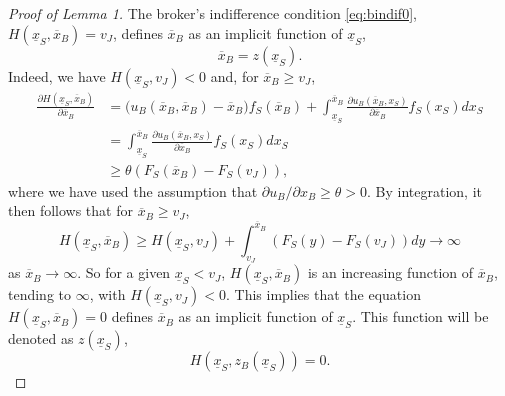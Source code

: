 \documentclass[11pt,twopage]{article}
\newcommand{\ol}{\overline}
\newcommand{\ul}{\underline}
\begin{document}
\begin{proof}[Proof of Lemma 1]
  The broker's indifference condition \eqref{eq:bindif0},
  $H(\underline x_S,\ol x_B) = v_J$, defines $\ol x_B$ as an implicit
  function of $\underline x_S$, \[ \ol x_B=z(\underline x_S).\]
  Indeed, we have $H(\ul x_S,v_J)<0$ and, for $\ol x_B \geq
  v_J$, \begin{align*} \frac{\partial H(\underline x_S,\ol
      x_B)}{\partial \ol x_B} &= \Big( u_B(\ol x_B,\ol x_B) - \ol x_B
    \Big)f_S(\ol x_B)+\int_{\ul x_S}^{\ol x_B} \frac{\partial u_B(\ol
      x_B,x_S)}{\partial \ol x_B} f_S(x_S) dx_S
    \\
    &= \int_{\ul x_S}^{\ol x_B} \frac{\partial u_B(\ol
      x_B,x_S)}{\partial \ol x_B} f_S(x_S) dx_S
    \\
    &\geq \theta (F_S(\ol x_B) - F_S(v_J)),
  \end{align*}
  where we have used the assumption that $\partial u_B/\partial x_B
  \geq \theta >0$. By integration, it then follows that for $\ol x_B
  \geq v_J$,
  \[
  H(\ul x_S, \ol x_B) \geq H( \ul x_S,v_J) + \int_{v_J}^{\ol x_B}
  (F_S(y) - F_S(v_J))dy \to \infty
  \]
  as $\ol x_B \to \infty$. So for a given $\ul x_S < v_J$, $H(\ul
  x_S,\ol x_B)$ is an increasing function of $\ol x_B$, tending to
  $\infty$, with $H(\ul x_S,v_J) < 0$. This implies that the equation
  $H(\ul x_S, \ol x_B) = 0$ defines $\ol x_B$ as an implicit function
  of $\ul x_S$. This function will be denoted as $z(\ul x_S)$,
  \[ H( \ul x_S, z_B(\ul x_S)) = 0 . \]


\end{proof}
\end{document}
